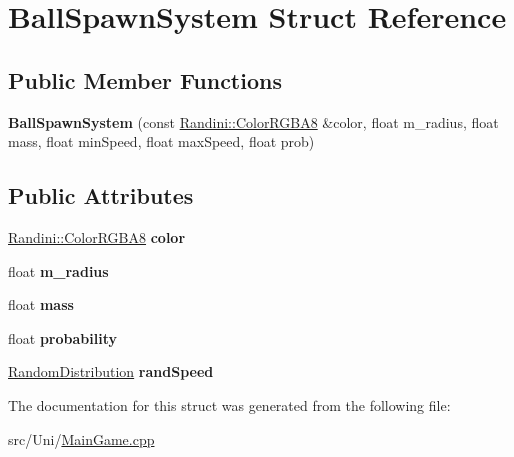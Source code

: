 \hypertarget{structBallSpawnSystem}{
\section{BallSpawnSystem Struct Reference}
\label{structBallSpawnSystem}
}
\subsection*{Public Member Functions}
\begin{DoxyCompactItemize}
\item 
\hypertarget{structBallSpawnSystem_a1123b7053659b1ae8aa6cdd2981b0c01}{
{\bfseries BallSpawnSystem} (const \hyperlink{structRandini_1_1ColorRGBA8}{Randini::ColorRGBA8} \&color, float m\_\-radius, float mass, float minSpeed, float maxSpeed, float prob)}
\label{structBallSpawnSystem_a1123b7053659b1ae8aa6cdd2981b0c01}

\end{DoxyCompactItemize}
\subsection*{Public Attributes}
\begin{DoxyCompactItemize}
\item 
\hypertarget{structBallSpawnSystem_a3bb75a1b6cf6aac33081119dd2198777}{
\hyperlink{structRandini_1_1ColorRGBA8}{Randini::ColorRGBA8} {\bfseries color}}
\label{structBallSpawnSystem_a3bb75a1b6cf6aac33081119dd2198777}

\item 
\hypertarget{structBallSpawnSystem_a7f9ac4289317532de48df707153e1bd5}{
float {\bfseries m\_\-radius}}
\label{structBallSpawnSystem_a7f9ac4289317532de48df707153e1bd5}

\item 
\hypertarget{structBallSpawnSystem_ad718e14c232b6006f0722d89ed591107}{
float {\bfseries mass}}
\label{structBallSpawnSystem_ad718e14c232b6006f0722d89ed591107}

\item 
\hypertarget{structBallSpawnSystem_afcdf95906eddebf9fc5324ba664959e1}{
float {\bfseries probability}}
\label{structBallSpawnSystem_afcdf95906eddebf9fc5324ba664959e1}

\item 
\hypertarget{structBallSpawnSystem_a1176dfb472047938d78177daceb3b9b8}{
\hyperlink{MainGame_8h_a3bbd6868c609bd755d6336c79fad44aa}{RandomDistribution} {\bfseries randSpeed}}
\label{structBallSpawnSystem_a1176dfb472047938d78177daceb3b9b8}

\end{DoxyCompactItemize}


The documentation for this struct was generated from the following file:\begin{DoxyCompactItemize}
\item 
src/Uni/\hyperlink{MainGame_8cpp}{MainGame.cpp}\end{DoxyCompactItemize}
